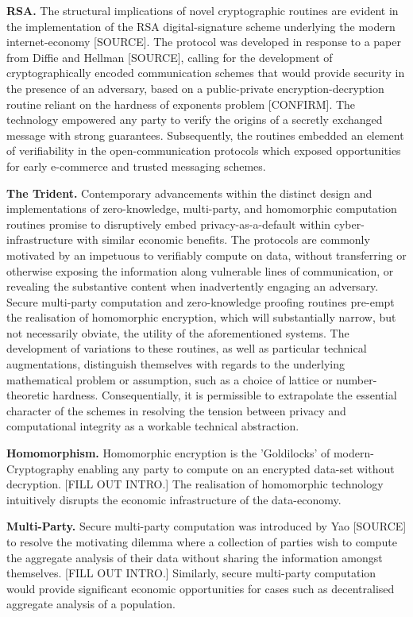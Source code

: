 \documentclass[twocolumn]{scrartcl}
\begin{document}
\textbf{RSA.} The structural implications of novel cryptographic routines are evident in the implementation of the RSA digital-signature scheme underlying the modern internet-economy [SOURCE]. The protocol was developed in response to a paper from Diffie and Hellman [SOURCE], calling for the development of cryptographically encoded communication schemes that would provide security in the presence of an adversary, based on a public-private encryption-decryption routine reliant on the hardness of exponents problem [CONFIRM]. The technology empowered any party to verify the origins of a secretly exchanged message with strong guarantees. Subsequently, the routines embedded an element of verifiability in the open-communication protocols which exposed opportunities for early e-commerce and trusted messaging schemes.

\textbf{The Trident.} Contemporary advancements within the distinct design and implementations of zero-knowledge, multi-party, and homomorphic computation routines promise to disruptively embed privacy-as-a-default within cyber-infrastructure with similar economic benefits. The protocols are commonly motivated by an impetuous to verifiably compute on data, without transferring or otherwise exposing the information along vulnerable lines of communication, or revealing the substantive content when inadvertently engaging an adversary. Secure multi-party computation and zero-knowledge proofing routines pre-empt the realisation of homomorphic encryption, which will substantially narrow, but not necessarily obviate, the utility of the aforementioned systems. The development of variations to these routines, as well as particular technical augmentations, distinguish themselves with regards to the underlying mathematical problem or assumption, such as a choice of lattice or number-theoretic hardness. Consequentially, it is permissible to extrapolate the essential character of the schemes in resolving the tension between privacy and computational integrity as a workable technical abstraction.


\textbf{Homomorphism.} Homomorphic encryption is the 'Goldilocks' of modern-Cryptography enabling any party to compute on an encrypted data-set without decryption. [FILL OUT INTRO.] The realisation of homomorphic technology intuitively disrupts the economic infrastructure of the data-economy.

\textbf{Multi-Party.} Secure multi-party computation was introduced by Yao [SOURCE] to resolve the motivating dilemma where a collection of parties wish to compute the aggregate analysis of their data without sharing the information amongst themselves. [FILL OUT INTRO.] Similarly, secure multi-party computation would provide significant economic opportunities for cases such as decentralised aggregate analysis of a population.
\end{document}
